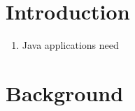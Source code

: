 \documentclass[a4paper,12pt,twoside,openright]{report}
\begin{document}
\pagestyle{empty}
\singlespacing

\onehalfspacing

\singlespacing


\setcounter{page}{0}
\pagestyle{plain}
\tableofcontents
\listoffigures
\listoftables

\onehalfspacing


\chapter{Introduction}
\setcounter{page}{1} 

% 
% 



\begin{enumerate}
	\item Java applications need 
\end{enumerate}

\chapter{Background} 

% 
\end{document}
